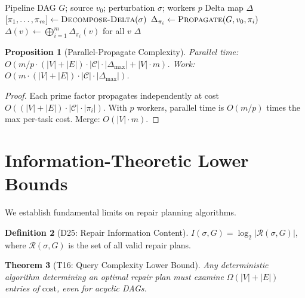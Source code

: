 \documentclass[11pt,a4paper]{article}
\newtheorem{theorem}{Theorem}[section]
\newtheorem{proposition}[theorem]{Proposition}
\theoremstyle{definition}
\newtheorem{definition}[theorem]{Definition}
\newcommand{\cost}{\mathrm{cost}}
\begin{document}
\begin{algorithm}[htbp]
\caption{\textsc{Parallel-Propagate}: Independent Delta Propagation}
\label{alg:parallel-propagate}
\begin{algorithmic}[1]
\Require Pipeline DAG $G$; source $v_0$; perturbation $\sigma$; workers $p$
\Ensure Delta map $\Delta$
\State $[\pi_1, \ldots, \pi_m] \gets \textsc{Decompose-Delta}(\sigma)$
  \State $\Delta_{\pi_i} \gets \textsc{Propagate}(G, v_0, \pi_i)$
\EndFor
\State $\Delta(v) \gets \bigoplus_{i=1}^m \Delta_{\pi_i}(v)$ for all $v$
\State \Return $\Delta$
\end{algorithmic}
\end{algorithm}

\begin{proposition}[Parallel-Propagate Complexity]\label{prop:parallel-complexity}
Parallel time: $O(m/p \cdot (|V| + |E|) \cdot |\mathcal{C}| \cdot |\Delta_{\max}| + |V| \cdot m)$.
Work: $O(m \cdot (|V| + |E|) \cdot |\mathcal{C}| \cdot |\Delta_{\max}|)$.
\end{proposition}

\begin{proof}
Each prime factor propagates independently at cost
$O((|V| + |E|) \cdot |\mathcal{C}| \cdot |\pi_i|)$.  With $p$ workers, parallel
time is $O(m/p)$ times the max per-task cost.  Merge: $O(|V| \cdot m)$.
\end{proof}


\section{Information-Theoretic Lower Bounds}
\label{sec:lower-bounds}

We establish fundamental limits on repair planning algorithms.

\begin{definition}[D25: Repair Information Content]\label{def:repair-info}
$I(\sigma, G) = \log_2 |\mathcal{R}(\sigma, G)|$,
where $\mathcal{R}(\sigma, G)$ is the set of all valid repair plans.
\end{definition}

\begin{theorem}[T16: Query Complexity Lower Bound]\label{thm:query-lower}
Any deterministic algorithm determining an optimal repair plan must examine
$\Omega(|V| + |E|)$ entries of $\cost$, even for acyclic DAGs.
\end{theorem}
\end{document}
